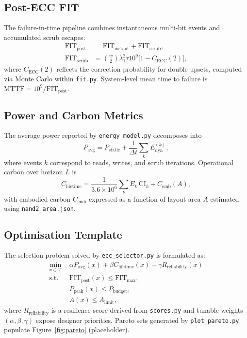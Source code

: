 \documentclass[conference]{IEEEtran}
\begin{document}
\subsection{Post-ECC FIT}
The failure-in-time pipeline combines instantaneous multi-bit events and accumulated scrub escapes:
\begin{align}
\text{FIT}_{\text{post}} &= \text{FIT}_{\text{instant}} + \text{FIT}_{\text{scrub}},\\
\text{FIT}_{\text{scrub}} &= \binom{w}{2} \lambda_{1}^{2} \tau 10^{9} \bigl[1-C_{\text{ECC}}(2)\bigr],
\end{align}
where $C_{\text{ECC}}(2)$ reflects the correction probability for double upsets, computed via Monte Carlo within \texttt{fit.py}.
System-level mean time to failure is $\text{MTTF}=10^{9}/\text{FIT}_{\text{post}}$.

\subsection{Power and Carbon Metrics}
The average power reported by \texttt{energy\_model.py} decomposes into
\begin{equation}
P_{\text{avg}} = P_{\text{static}} + \frac{1}{\Delta t} \sum_{k} E_{\text{dyn}}^{(k)},
\end{equation}
where events $k$ correspond to reads, writes, and scrub iterations.
Operational carbon over horizon $L$ is
\begin{equation}
C_{\text{lifetime}} = \frac{1}{3.6\times10^{6}} \sum_{k} E_{k}\,\text{CI}_{k} + C_{\text{emb}}(A),
\end{equation}
with embodied carbon $C_{\text{emb}}$ expressed as a function of layout area $A$ estimated using \texttt{nand2\_area.json}.

\subsection{Optimisation Template}
The selection problem solved by \texttt{ecc\_selector.py} is formulated as:
\begin{align}
\min_{x \in \mathcal{X}} & \; \alpha P_{\text{avg}}(x) + \beta C_{\text{lifetime}}(x) - \gamma R_{\text{reliability}}(x) \\
\text{s.t.} & \; \text{FIT}_{\text{post}}(x) \leq \text{FIT}_{\max},\\
& \; P_{\text{peak}}(x) \leq P_{\text{budget}},\\
& \; A(x) \leq A_{\text{limit}},
\end{align}
where $R_{\text{reliability}}$ is a resilience score derived from \texttt{scores.py} and tunable weights $(\alpha,\beta,\gamma)$ expose designer priorities.
Pareto sets generated by \texttt{plot\_pareto.py} populate Figure~\ref{fig:pareto} (placeholder).
\end{document}
